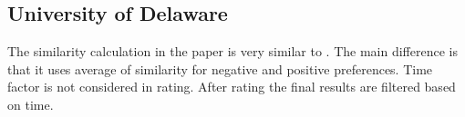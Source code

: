 \subsection{University of Delaware \cite{Delaware}}
The similarity calculation in the paper is very similar to \cite{IRIT}. The main difference is that it uses average of similarity for negative and positive preferences. Time factor is not considered in rating. After rating the final results are filtered based on time.
